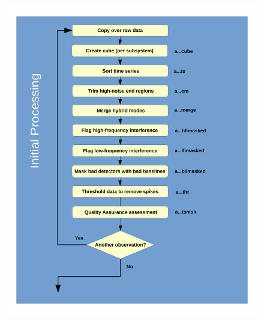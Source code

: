 \documentclass[11pt,oneside,chapters]{starlink}
\begin{document}
\begin{figure}[h!]
\begin{center}
\includegraphics[width=0.81\linewidth]{sc20_workflow_initial}
\end{center}
\end{figure}
\end{document}
